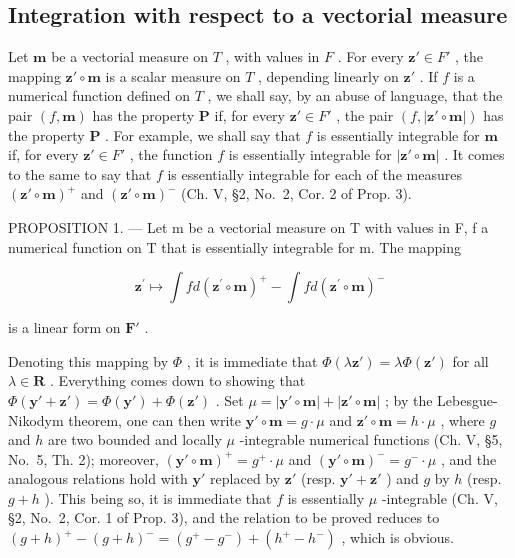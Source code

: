 \subsection{Integration with respect to a vectorial measure}

Let \(\mathbf{m}\) be a vectorial measure on \(T\) , with values in \(F\) . For every \(\mathbf{z}' \in F'\) , the mapping \(\mathbf{z}' \circ \mathbf{m}\) is a scalar measure on \(T\) , depending linearly on \(\mathbf{z}'\) . If \(f\) is a numerical function defined on \(T\) , we shall say, by an abuse of language, that the pair \((f, \mathbf{m})\) has the property \(\boldsymbol{P}\) if, for every \(\mathbf{z}' \in F'\) , the pair \((f, |\mathbf{z}' \circ \mathbf{m}|)\) has the property \(\boldsymbol{P}\) . For example, we shall say that \(f\) is essentially integrable for \(\mathbf{m}\) if, for every \(\mathbf{z}' \in F'\) , the function \(f\) is essentially integrable for \(|\mathbf{z}' \circ \mathbf{m}|\) . It comes to the same to say that \(f\) is essentially integrable for each of the measures \((\mathbf{z}' \circ \mathbf{m})^+\) and \((\mathbf{z}' \circ \mathbf{m})^-\) (Ch. V, §2, No.~2, Cor. 2 of Prop. 3).

PROPOSITION 1. --- Let m be a vectorial measure on T with values in F, f a numerical function on T that is essentially integrable for m. The mapping

\[
\mathbf {z} ^ {\prime} \mapsto \int f d (\mathbf {z} ^ {\prime} \circ \mathbf {m}) ^ {+} - \int f d (\mathbf {z} ^ {\prime} \circ \mathbf {m}) ^ {-}
\]

is a linear form on \(\mathbf{F}'\) .

Denoting this mapping by \(\Phi\) , it is immediate that \(\Phi(\lambda\mathbf{z}') = \lambda\Phi(\mathbf{z}')\) for all \(\lambda \in \mathbf{R}\) . Everything comes down to showing that \(\Phi(\mathbf{y}' + \mathbf{z}') = \Phi(\mathbf{y}') + \Phi(\mathbf{z}')\) . Set \(\mu = |\mathbf{y}' \circ \mathbf{m}| + |\mathbf{z}' \circ \mathbf{m}|\) ; by the Lebesgue-Nikodym theorem, one can then write \(\mathbf{y}' \circ \mathbf{m} = g \cdot \mu\) and \(\mathbf{z}' \circ \mathbf{m} = h \cdot \mu\) , where \(g\) and \(h\) are two bounded and locally \(\mu\) -integrable numerical functions (Ch. V, §5, No.~5, Th. 2); moreover, \((\mathbf{y}' \circ \mathbf{m})^+ = g^+ \cdot \mu\) and \((\mathbf{y}' \circ \mathbf{m})^- = g^- \cdot \mu\) , and the analogous relations hold with \(\mathbf{y}'\) replaced by \(\mathbf{z}'\) (resp. \(\mathbf{y}' + \mathbf{z}'\) ) and \(g\) by \(h\) (resp. \(g + h\) ). This being so, it is immediate that \(f\) is essentially \(\mu\) -integrable (Ch. V, §2, No.~2, Cor. 1 of Prop. 3), and the relation to be proved reduces to \((g + h)^+ - (g + h)^- = (g^+ - g^-) + (h^+ - h^-)\) , which is obvious.

